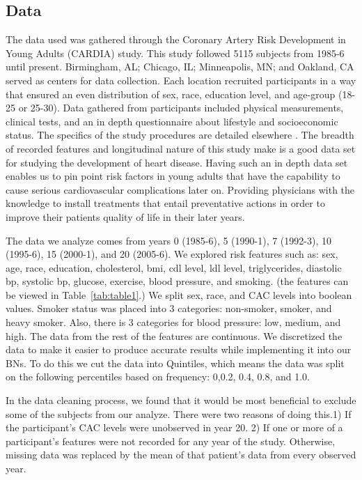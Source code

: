 \documentclass[letterpaper]{article}
\begin{document}
\subsection{Data}

The data used was gathered through the Coronary Artery Risk Development in Young Adults (CARDIA) study. This study followed 5115 subjects from 1985-6 until present. Birmingham, AL; Chicago, IL; Minneapolis, MN; and Oakland, CA served as centers for data collection. Each location recruited participants in a way that ensured an even distribution of sex, race, education level, and age-group (18-25 or 25-30). Data gathered from participants included physical measurements, clinical tests, and an in depth questionnaire about lifestyle and socioeconomic status.  The specifics of the study procedures are detailed elsewhere \cite{Friedman1988}.  The breadth of recorded features and longitudinal nature of this study make is a good data set for studying the development of heart disease.  Having such an in depth data set enables us to pin point risk factors in young adults that have the capability to cause serious cardiovascular complications later on.  Providing physicians with the knowledge to install treatments that entail preventative actions in order to improve their patients quality of life in their later years.

The data we analyze comes from years 0 (1985-6), 5 (1990-1), 7 (1992-3), 10 (1995-6), 15 (2000-1), and 20 (2005-6).  We explored risk features such as: sex, age, race, education, cholesterol, bmi, cdl level, ldl level, triglycerides, diastolic bp, systolic bp, glucose, exercise, blood pressure, and smoking. (the features can be viewed in Table~\ref{tab:table1}.)  We split sex, race, and CAC levels into boolean values.   Smoker status was placed into 3 categories: non-smoker, smoker, and heavy smoker.  Also, there is 3 categories for blood pressure:  low, medium, and high.  The data from the rest of the features are continuous.  We discretized the data to make it easier to produce accurate results while implementing it into our BNs.  To do this we cut the data into Quintiles, which means the data was split on the following percentiles based on frequency: 0,0.2, 0.4, 0.8, and 1.0.

In the data cleaning process, we found that it would be most beneficial to exclude some of the subjects from our analyze.  There were two reasons of doing this.1) If the participant's CAC levels were unobserved in year 20. 2) If one or more of a participant's features were not recorded for any year of the study. Otherwise, missing data was replaced by the mean of that patient's data from every observed year.  
\end{document}
